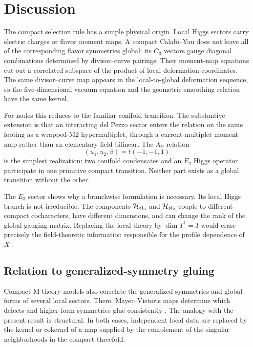 \section{Discussion}
\label{sec:discussion}

The compact selection rule has a simple physical origin. Local Higgs sectors
carry electric charges or flavor moment maps. A compact Calabi--Yau does not
leave all of the corresponding flavor symmetries global: its $C_3$ vectors
gauge diagonal combinations determined by divisor--curve pairings. Their
moment-map equations cut out a correlated subspace of the product of local
deformation coordinates. The same divisor--curve map appears in the
local-to-global deformation sequence, so the five-dimensional vacuum equation
and the geometric smoothing relation have the same kernel.

For nodes this reduces to the familiar conifold transition. The substantive
extension is that an interacting del Pezzo sector enters the relation on the
same footing as a wrapped-M2 hypermultiplet, through a current-multiplet moment
map rather than an elementary field bilinear. The $X_9$ relation
\begin{equation}
 (u_1,u_2,\beta)=t(-1,-1,1)
\end{equation}
is the simplest realization: two conifold condensates and an $E_2$ Higgs
operator participate in one primitive compact transition. Neither part exists
as a global transition without the other.

The $E_3$ sector shows why a branchwise formulation is necessary. Its local
Higgs branch is not irreducible. The components
$\mathcal H_{\mathfrak{sl}_3}$ and $\mathcal H_{\mathfrak{sl}_2}$ couple to different
compact cocharacters, have different dimensions, and can change the rank of
the global gauging matrix. Replacing the local theory by
$\dim T^1=3$ would erase precisely the field-theoretic information responsible
for the profile dependence of $X^{\circ}$.

\subsection{Relation to generalized-symmetry gluing}
\label{subsec:generalized-symmetry-relation}

Compact M-theory models also correlate the generalized symmetries and global
forms of several local sectors. There, Mayer--Vietoris maps determine which
defects and higher-form symmetries glue consistently
\cite{Cvetic:2023plv}. The analogy with the present result is structural. In
both cases, independent local data are replaced by the kernel or cokernel of a
map supplied by the complement of the singular neighborhoods in the compact
threefold.

